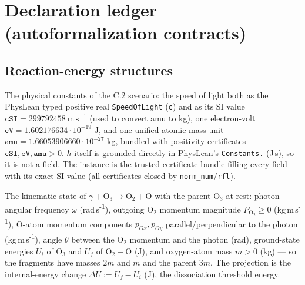 
\section*{Declaration ledger (autoformalization contracts)}

\subsection*{Reaction-energy structures}

\begin{definition}
\label{def:IPhO2026Problems_problem_IPhO_2026_1_C_2:PhotoDissociationConstants}
The physical constants of the C.2 scenario: the speed of light both as the
PhysLean typed positive real \texttt{SpeedOfLight} (\texttt{c}) and as its SI
value $\texttt{cSI} = 299792458\ \mathrm{m\,s^{-1}}$ (used to convert amu to
kg), one electron-volt $\texttt{eV} = 1.602176634{\cdot}10^{-19}$ J, and one
unified atomic mass unit $\texttt{amu} = 1.66053906660{\cdot}10^{-27}$ kg,
bundled with positivity certificates $\texttt{cSI}, \texttt{eV},
\texttt{amu} > 0$.  $\hbar$ itself is grounded directly in PhysLean's
\texttt{Constants.\hbar} (J\,s), so it is not a field.  The instance
 is the trusted
certificate bundle filling every field with its exact SI value (all
certificates closed by \texttt{norm\_num}/\texttt{rfl}).
\end{definition}

\begin{definition}
\label{def:IPhO2026Problems_problem_IPhO_2026_1_C_2:DissociationState}
The kinematic state of $\gamma + \mathrm{O_3} \to \mathrm{O_2} + \mathrm{O}$
with the parent $\mathrm{O_3}$ at rest: photon angular frequency $\omega$
(rad\,s\textsuperscript{-1}), outgoing $\mathrm{O_2}$ momentum magnitude
$P_{\mathrm{O_2}} \ge 0$ (kg\,m\,s\textsuperscript{-1}), O-atom momentum
components $p_{Ox}, p_{Oy}$ parallel/perpendicular to the photon
(kg\,m\,s\textsuperscript{-1}), angle $\theta$ between the $\mathrm{O_2}$
momentum and the photon (rad), ground-state energies $U_i$ of $\mathrm{O_3}$
and $U_f$ of $\mathrm{O_2}+\mathrm{O}$ (J), and oxygen-atom mass $m > 0$ (kg)
— so the fragments have masses $2m$ and $m$ and the parent $3m$.  The
projection  is the internal-energy
change $\Delta U := U_f - U_i$ (J), the dissociation threshold energy.
\end{definition}

